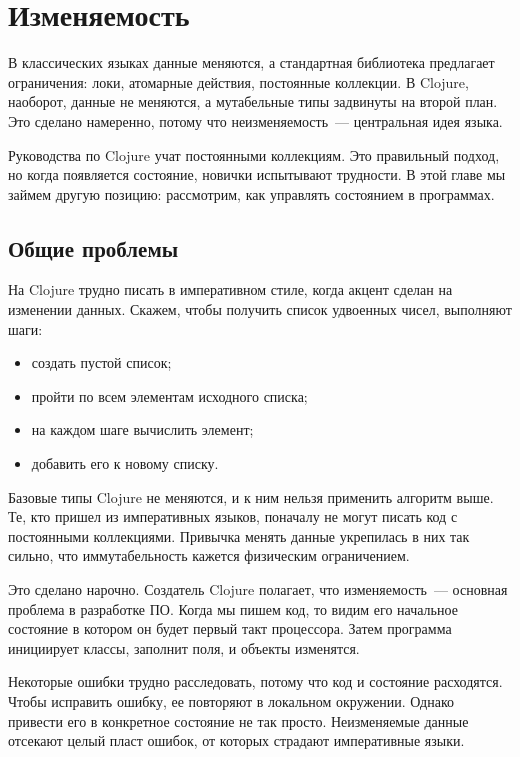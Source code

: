 \chapter{Изменяемость}

\begin{teaser}
В классических языках данные меняются, а стандартная библиотека предлагает
ограничения: локи, атомарные действия, постоянные коллекции. В Clojure,
наоборот, данные не меняются, а мутабельные типы задвинуты на второй план. Это
сделано намеренно, потому что неизменяемость~--- центральная идея языка.
\end{teaser}

Руководства по Clojure учат постоянными коллекциям. Это правильный подход, но
когда появляется состояние, новички испытывают трудности. В этой главе мы займем
другую позицию: рассмотрим, как управлять состоянием в программах.

\section{Общие проблемы}

На Clojure трудно писать в императивном стиле, когда акцент сделан на изменении
данных. Скажем, чтобы получить список удвоенных чисел, выполняют шаги:

\begin{itemize}
\item
  создать пустой список;
\item
  пройти по всем элементам исходного списка;
\item
  на каждом шаге вычислить элемент;
\item
  добавить его к новому списку.
\end{itemize}

Базовые типы Clojure не меняются, и к ним нельзя применить алгоритм выше. Те,
кто пришел из императивных языков, поначалу не могут писать код с постоянными
коллекциями. Привычка менять данные укрепилась в них так сильно, что
иммутабельность кажется физическим ограничением.

Это сделано нарочно. Создатель Clojure полагает, что изменяемость~--- основная
проблема в разработке ПО. Когда мы пишем код, то видим его начальное состояние в
котором он будет первый такт процессора. Затем программа инициирует классы,
заполнит поля, и объекты изменятся.

Некоторые ошибки трудно расследовать, потому что код и состояние
расходятся. Чтобы исправить ошибку, ее повторяют в локальном окружении. Однако
привести его в конкретное состояние не так просто. Неизменяемые данные отсекают
целый пласт ошибок, от которых страдают императивные языки.

